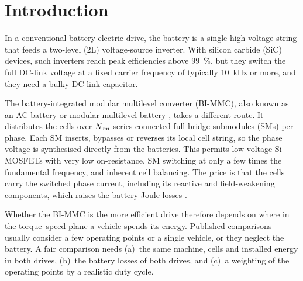 \section{Introduction}
In a conventional battery-electric drive, the battery is a single high-voltage string that feeds a two-level (2L) voltage-source inverter. With silicon carbide (SiC) devices, such inverters reach peak efficiencies above \SI{99}{\percent}, but they switch the full DC-link voltage at a fixed carrier frequency of typically \SI{10}{\kilo\hertz} or more, and they need a bulky DC-link capacitor.

The battery-integrated modular multilevel converter (BI-MMC), also known as an AC battery or modular multilevel battery \cite{lesnicar2003,helling2016,quraan2016}, takes a different route. It distributes the cells over $N_\mathrm{sm}$ series-connected full-bridge submodules (SMs) per phase. Each SM inserts, bypasses or reverses its local cell string, so the phase voltage is synthesised directly from the batteries. This permits low-voltage Si MOSFETs with very low on-resistance, SM switching at only a few times the fundamental frequency, and inherent cell balancing. The price is that the cells carry the switched phase current, including its reactive and field-weakening components, which raises the battery Joule losses \cite{kersten2019}.

Whether the BI-MMC is the more efficient drive therefore depends on where in the torque--speed plane a vehicle spends its energy. Published comparisons usually consider a few operating points or a single vehicle, or they neglect the battery. A fair comparison needs (a)~the same machine, cells and installed energy in both drives, (b)~the battery losses of both drives, and (c)~a weighting of the operating points by a realistic duty cycle.

